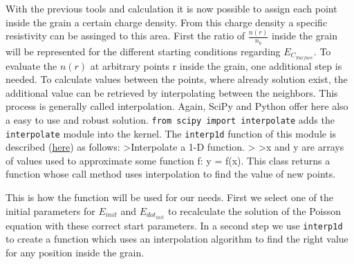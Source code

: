 \documentclass[11pt]{article}
\begin{document}
    With the previous tools and calculation it is now possible to assign
each point inside the grain a certain charge density. From this charge
density a specific resistivity can be assinged to this area. First the
ratio of \(\frac{n(r)}{n_b}\) inside the grain will be represented for
the different starting conditions regarding \(E_{C_{Surface}}\). To
evaluate the \(n(r)\) at arbitrary points r inside the grain, one
additional step is needed. To calculate values between the points, where
already solution exist, the additional value can be retrieved by
interpolating between the neighbors. This process is generally called
interpolation. Again, SciPy and Python offer here also a easy to use and
robust solution. \texttt{from\ scipy\ import\ interpolate} adds the
\texttt{interpolate} module into the kernel. The \texttt{interp1d}
function of this module is described
(\href{https://docs.scipy.org/doc/scipy/reference/generated/scipy.interpolate.interp1d.htm}{here})
as follows: \textgreater Interpolate a 1-D function. \textgreater{}
\textgreater x and y are arrays of values used to approximate some
function f: y = f(x). This class returns a function whose call method
uses interpolation to find the value of new points.

This is how the function will be used for our needs. First we select one
of the initial parameters for \(E_{init}\) and \(E_{dot_{init}}\) to
recalculate the solution of the Poisson equation with these correct
start parameters. In a second step we use \texttt{interp1d} to create a
function which uses an interpolation algorithm to find the right value
for any position inside the grain.
\end{document}
